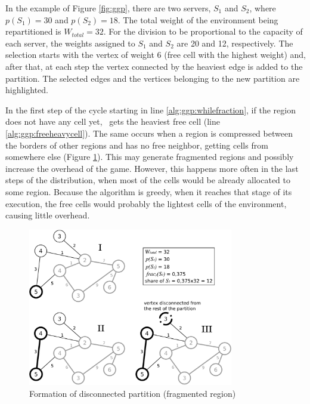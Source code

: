 In the example of Figure \ref{fig:ggp}, there are two servers, $S_1$ and $S_2$, where $p(S_1) = 30$ and $p(S_2) = 18$. The total weight of the environment being repartitioned is $W_{total} = 32$. For the division to be proportional to the capacity of each server, the weights assigned to $S_1 $ and $S_2$ are 20 and 12, respectively. The selection starts with the vertex of weight 6 (free cell with the highest weight) and, after that, at each step the vertex connected by the heaviest edge is added to the partition. The selected edges and the vertices belonging to the new partition are highlighted.

In the first step of the cycle starting in line \ref{alg:ggp:whilefraction}, if the region does not have any cell yet, \ggp\ gets the heaviest free cell (line \ref{alg:ggp:freeheavycell}). The same occurs when a region is compressed between the borders of other regions and has no free neighbor, getting cells from somewhere else (Figure \ref{fig:compressed}). This may generate fragmented regions and possibly increase the overhead of the game. However, this happens more often in the last steps of the distribution, when most of the cells would be already allocated to some region. Because the algorithm is greedy, when it reaches that stage of its execution, the free cells would probably the lightest cells of the environment, causing little overhead.

\begin{figure}
\centering
\includegraphics[width=0.8\textwidth]{images/compressed}
\caption{Formation of disconnected partition (fragmented region)}
\label{fig:compressed}
\end{figure}

\subsubsection{\ggpk} %

